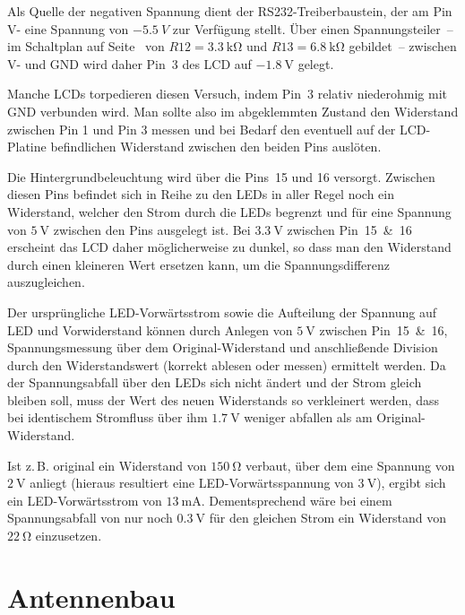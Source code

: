 \documentclass[paper=a4, parskip, numbers=noenddot, toc=listof, headsepline]{scrbook}
\begin{document}
			Als Quelle der negativen Spannung dient der RS232-Treiberbaustein, der am Pin V- eine Spannung von $\SI{-5,5}{V}$ zur Verfügung stellt. Über einen Spannungsteiler~-- im Schaltplan auf Seite~\pageref{fig:transmitterschematic} von $R12 = \SI{3,3}{\kilo\ohm}$ und $R13 = \SI{6,8}{\kilo\ohm}$ gebildet~-- zwischen V- und GND wird daher Pin~3 des LCD auf $\SI{-1,8}{\volt}$ gelegt.

			Manche LCDs torpedieren diesen Versuch, indem Pin~3 relativ niederohmig mit GND verbunden wird. Man sollte also im abgeklemmten Zustand den Widerstand zwischen Pin 1 und Pin 3 messen und bei Bedarf den eventuell auf der LCD-Platine befindlichen Widerstand zwischen den beiden Pins auslöten.

			Die Hintergrundbeleuchtung wird über die Pins~15 und 16 versorgt. Zwischen diesen Pins befindet sich in Reihe zu den LEDs in aller Regel noch ein Widerstand, welcher den Strom durch die LEDs begrenzt und für eine Spannung von $\SI{5}{\volt}$ zwischen den Pins ausgelegt ist. Bei $\SI{3,3}{\volt}$ zwischen Pin~15~\&~16 erscheint das LCD daher möglicherweise zu dunkel, so dass man den Widerstand durch einen kleineren Wert ersetzen kann, um die Spannungsdifferenz auszugleichen.

			Der ursprüngliche LED-Vorwärtsstrom sowie die Aufteilung der Spannung auf LED und Vorwiderstand können durch Anlegen von $\SI{5}{\volt}$ zwischen Pin~15~\&~16, Spannungsmessung über dem Original-Widerstand und anschließende Division durch den Widerstandswert (korrekt ablesen oder messen) ermittelt werden. Da der Spannungsabfall über den LEDs sich nicht ändert und der Strom gleich bleiben soll, muss der Wert des neuen Widerstands so verkleinert werden, dass bei identischem Stromfluss über ihm $\SI{1,7}{\volt}$ weniger abfallen als am Original-Widerstand.

			Ist z.\,B. original ein Widerstand von $\SI{150}{\ohm}$ verbaut, über dem eine Spannung von $\SI{2}{\volt}$ anliegt (hieraus resultiert eine LED-Vorwärtsspannung von $\SI{3}{\volt}$), ergibt sich ein LED-Vorwärtsstrom von $\SI{13}{\milli\ampere}$. Dementsprechend wäre bei einem Spannungsabfall von nur noch $\SI{0,3}{\volt}$ für den gleichen Strom ein Widerstand von $\SI{22}{\ohm}$ einzusetzen.

		\section{Antennenbau}
\end{document}
